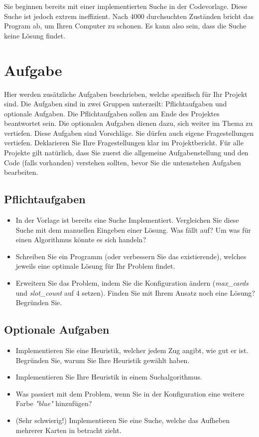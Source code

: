 \documentclass[a4paper,11pt,german,notitlepage]{report}
\begin{document}
Sie beginnen bereits mit einer implementierten Suche in der Codevorlage.
Diese Suche ist jedoch extrem ineffizient.
Nach 4000 durchsuchten Zuständen bricht das Program ab, um Ihren Computer zu schonen.
Es kann also sein, dass die Suche keine Lösung findet.

\section*{Aufgabe}
Hier werden zusätzliche Aufgaben beschrieben, welche spezifisch für Ihr Projekt sind.
Die Aufgaben sind in zwei Gruppen unterzeilt: Pflichtaufgaben und optionale Aufgaben.
Die Pflichtaufgaben sollen am Ende des Projektes beantwortet sein.
Die optionalen Aufgaben dienen dazu, sich weiter im Thema zu vertiefen.
Diese Aufgaben sind Vorschläge. Sie dürfen auch eigene Fragestellungen vertiefen.
Deklarieren Sie Ihre Fragestellungen klar im Projektbericht.
Für alle Projekte gilt natürlich, dass Sie zuerst die allgemeine Aufgabenstellung und den Code (falls vorhanden) verstehen sollten, bevor Sie die untenstehen Aufgaben bearbeiten.
\subsection*{Pflichtaufgaben}
\begin{itemize}
    \item In der Vorlage ist bereits eine Suche Implementiert. Vergleichen Sie diese Suche mit dem manuellen Eingeben einer Lösung. Was fällt auf? Um was für einen Algorithmus könnte es sich handeln?
    \item Schreiben Sie ein Programm (oder verbessern Sie das existierende), welches jeweils eine optimale Lösung für Ihr Problem findet.
    \item Erweitern Sie das Problem, indem Sie die Konfiguration ändern (\textit{max\_cards} und \textit{slot\_count} auf 4 setzen). Finden Sie mit Ihrem Ansatz noch eine Lösung? Begründen Sie.
\end{itemize}
\subsection*{Optionale Aufgaben}
\begin{itemize}
    \item Implementieren Sie eine Heuristik, welcher jedem Zug angibt, wie gut er ist. Begründen Sie, warum Sie Ihre Heuristik gewählt haben.
    \item Implementieren Sie Ihre Heuristik in einem Suchalgorithmus.
    \item Was passiert mit dem Problem, wenn Sie in der Konfiguration eine weitere Farbe \textit{"blue"} hinzufügen?
    \item (Sehr schwierig!) Implementieren Sie eine Suche, welche das Aufheben mehrerer Karten in betracht zieht.
\end{itemize}
\end{document}
